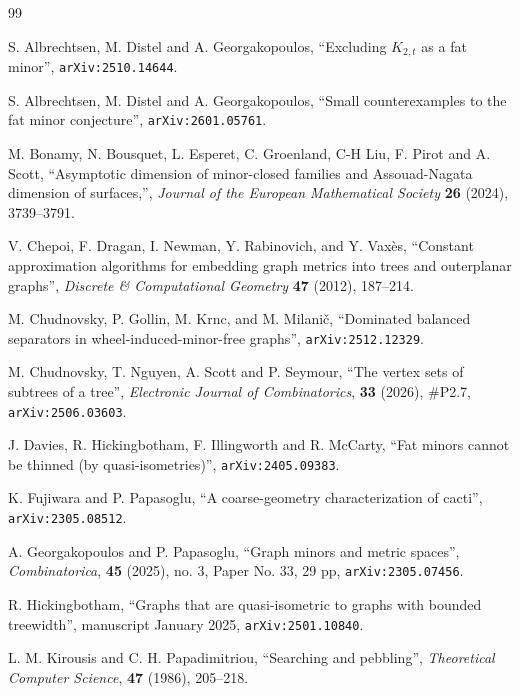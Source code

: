 \documentclass[titlepage,11pt]{article}
\begin{document}
	
	\begin{thebibliography}{99}
		
		 S. Albrechtsen, M. Distel and A. Georgakopoulos, ``Excluding $K_{2,t}$ as a fat minor'',
		{\tt arXiv:2510.14644}.
		
		 S. Albrechtsen, M. Distel and A. Georgakopoulos, ``Small counterexamples to the fat minor conjecture'', {\tt arXiv:2601.05761}.
		
		 M. Bonamy, N. Bousquet, L. Esperet, C. Groenland, C-H Liu, F. Pirot
		and A. Scott, ``Asymptotic dimension of minor-closed families and Assouad-Nagata dimension of surfaces,'', {\em Journal of the European Mathematical Society} {\bf 26} (2024), 3739--3791.
		
		V. Chepoi, F. Dragan, I. Newman, Y. Rabinovich, and
		Y. Vax\`es, ``Constant approximation algorithms for embedding graph metrics
		into trees and outerplanar graphs'', {\em Discrete \& Computational Geometry} {\bf 47} (2012), 187--214.
		
		 M. Chudnovsky, P. Gollin, M. Krnc, and M. Milani\v{c}, ``Dominated balanced separators in wheel-induced-minor-free graphs'', {\tt arXiv:2512.12329}. 
		
		 M. Chudnovsky, T. Nguyen, A. Scott and P. Seymour, ``The vertex sets of subtrees of a tree'', 
		{\em Electronic Journal of Combinatorics}, {\bf 33} (2026), \#P2.7, {\tt arXiv:2506.03603}.
		
		 J. Davies, R. Hickingbotham,  
		F. Illingworth and R. McCarty, ``Fat minors cannot be thinned
		(by quasi-isometries)'', {\tt arXiv:2405.09383}.
		
		
		 K. Fujiwara and P. Papasoglu, ``A coarse-geometry characterization of
		cacti'', {\tt arXiv:2305.08512}.
		
		 A. Georgakopoulos and P. Papasoglu, ``Graph minors and metric spaces'', {\em Combinatorica}, {\bf 45} (2025), no. 3, Paper No. 33, 29 pp, {\tt arXiv:2305.07456}.
		
		 R. Hickingbotham, ``Graphs that are 
		quasi-isometric to graphs with bounded treewidth'', manuscript January 2025, {\tt arXiv:2501.10840}.
		
		 L. M. Kirousis and C. H. Papadimitriou, ``Searching and pebbling'', {\em Theoretical Computer Science}, {\bf 47} (1986), 205--218.
		

\end{thebibliography}
\end{document}
